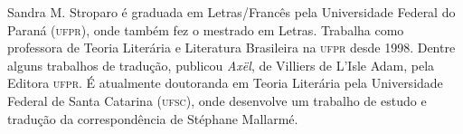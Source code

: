 \begin{resumopage}
\item[Sandra M. Stroparo] é graduada em Letras/Francês pela Universidade
Federal do Paraná (\textsc{ufpr}), onde também fez o mestrado em Letras.
Trabalha como professora de Teoria Literária e Literatura Brasileira na
\textsc{ufpr} desde 1998. Dentre alguns trabalhos de tradução, publicou
\textit{Axël}, de Villiers de L’Isle Adam, pela Editora \textsc{ufpr}. É
atualmente doutoranda em Teoria Literária pela Universidade Federal de
Santa Catarina (\textsc{ufsc}), onde desenvolve um trabalho de estudo e tradução
da correspondência de Stéphane Mallarmé. 

\end{resumopage}

